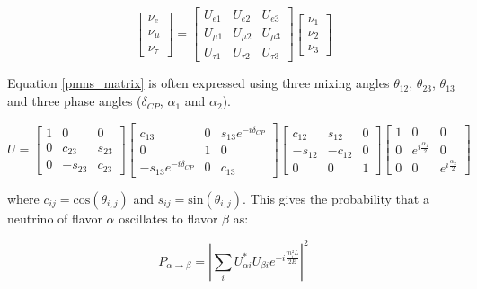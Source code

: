 \begin{equation}\label{pmns_matrix}
\begin{bmatrix} \nu_e \\ \nu_\mu \\ \nu_\tau \end{bmatrix} = \begin{bmatrix} U_{e1} & U_{e2} & U_{e3}\\ U_{\mu 1} & U_{\mu 2} & U_{\mu 3} \\ U_{\tau 1} & U_{\tau 2} & U_{\tau 3} \end{bmatrix} \begin{bmatrix} \nu_1 \\ \nu_2 \\ \nu_3 \end{bmatrix}
\end{equation}

Equation \ref{pmns_matrix} is often expressed using three mixing angles $\theta_{12}$, $\theta_{23}$, $\theta_{13}$ and three phase angles ($\delta_{CP}$, $\alpha_1$ and $\alpha_2$).

\begin{equation}\label{pmns_matrix_expanded}
U = \begin{bmatrix} 1 & 0 & 0\\ 0 & c_{23} & s_{23} \\ 0 & -s_{23} & c_{23} \end{bmatrix} \begin{bmatrix} c_{13} & 0 & s_{13}e^{-i\delta_{CP}}\\ 0 & 1 & 0 \\ -s_{13}e^{-i\delta_{CP}} & 0 & c_{13} \end{bmatrix} \begin{bmatrix} c_{12} & s_{12} & 0\\ -s_{12} & -c_{12} & 0 \\ 0 & 0 & 1 \end{bmatrix} \begin{bmatrix} 1 & 0 & 0\\ 0 & e^{i\frac{\alpha_1}{2}} & 0 \\ 0 & 0 & e^{i\frac{\alpha_2}{2}}\end{bmatrix}
\end{equation}

where $c_{ij}=\mathrm{cos}(\theta_{i,j})$ and $s_{ij}=\mathrm{sin}(\theta_{i,j})$. This gives the probability that a neutrino of flavor $\alpha$ oscillates to flavor $\beta$ as:

\begin{equation}\label{n_oscillation}
P_{\alpha\rightarrow\beta} = \left|\sum_i U^*_{\alpha i}U_{\beta i} e^{-i\frac{m_i^2L}{2E}}\right|^2
\end{equation}

